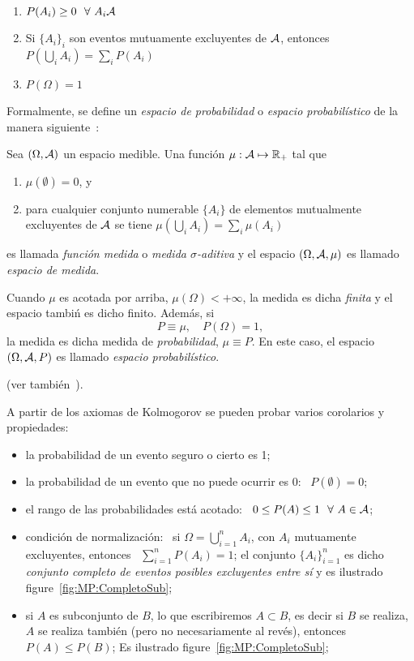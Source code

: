 %
\begin{enumerate}
\item $P(A_i) \geq 0 \ \ \forall \ A_i \mathcal{A}$
%
\item  Si $\{ A_i  \}_i$ son  eventos mutuamente  excluyentes de  $\mathcal{A}$, entonces
  $\displaystyle P\left( \bigcup_i A_i \right) = \sum_i P(A_i)$
%
\item $P(\Omega) = 1$
\end{enumerate}
%
Formalmente,  se  define  un  {\it  espacio  de  probabilidad}  o  {\it  espacio
  probabil\'istico}  de la  manera siguiente~\cite{Hal50,  Fel68,  Fel71, Bre88,
  IbaPar97, AthLah06, Bog07:v1, JacPro03, Coh13}:
%
\begin{definicion}
  Sea $(\Omega,\mathcal{A})$ un espacio medible.  Una funci\'on $\mu: \mathcal{A} \mapsto \mathbb{R}_+$
  tal que
  \begin{enumerate}
  \item $\mu(\emptyset) = 0$, y
  \item para cualquier  conjunto numerable $\{ A_i \}$  de elementos mutualmente
    excluyentes  de $\mathcal{A}$  se tiene  $\mu\left(  \bigcup_i A_i  \right) =  \sum_i
    \mu(A_i)$
  \end{enumerate}
  es  llamada {\it  funci\'on  medida}  o {\it  medida  $\sigma$-aditiva} y  el
  espacio $(\Omega,\mathcal{A},\mu)$ es  llamado {\it espacio de medida}.

  Cuando $\mu$  es acotada por  arriba, $\mu(\Omega) <  + \infty$, la  medida es
  dicha  {\it  finita} y  el  espacio tambi\'n  es  dicho  finito. Adem\'as,  si
  \[ P \equiv  \mu, \quad P(\Omega) = 1,  \] la medida es dicha  medida de {\it
    probabilidad}, $\mu \equiv P$.  En  este caso, el espacio $(\Omega,\mathcal{A},P)$ es
  llamado {\it espacio probabil\'istico}.
\end{definicion}
%
\noindent (ver tambi\'en~\cite[Cap.~5 \& 6]{KolFom61}).

A  partir de  los axiomas  de Kolmogorov  se pueden  probar varios  corolarios y
propiedades:
%
\begin{itemize}
\item la probabilidad de un evento seguro o cierto es 1;
%
\item  la   probabilidad  de   un  evento   que  no  puede   ocurrir  es   0:  \
  $P(\emptyset) = 0$;
%
\item el rango  de las probabilidades est\'a  acotado: \ $0 \leq P(A)  \leq 1\ \
  \forall \ A \in \mathcal{A}$;
%
\item condici\'on de  normalizaci\'on: \ si $\Omega =  \bigcup_{i=1}^n A_i$, con
  $A_i$  mutuamente  excluyentes,  entonces  \  $\sum_{i=1}^n P(A_i)  =  1$;  el
  conjunto  $\{ A_i  \}_{i=1}^n$  es  dicho {\it  conjunto  completo de  eventos
    posibles      excluyentes      entre      s\'i}     y      es      ilustrado
  figure~\ref{fig:MP:CompletoSub};
%
\item si $A$ es subconjunto de $B$,  lo que escribiremos $A \subset B$, es decir
  si  $B$  se realiza,  $A$  se realiza  tambi\'en  (pero  no necesariamente  al
  rev\'es),     entonces     \     $P(A)     \leq    P(B)$;     Es     ilustrado
  figure~\ref{fig:MP:CompletoSub};
\end{itemize}

